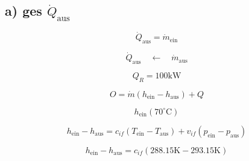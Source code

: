 \subsection*{a) ges $\dot{Q}_{\text{aus}}$}

\[
\dot{Q}_{\text{aus}} = \dot{m}_{\text{ein}}
\]

\[
\dot{Q}_{\text{aus}} \quad \longleftarrow \quad \dot{m}_{\text{aus}}
\]

\[
Q_R = 100 \text{kW}
\]

\[
O = \dot{m} (h_{\text{ein}} - h_{\text{aus}}) + Q
\]

\[
h_{\text{ein}} (70^\circ \text{C})
\]

\[
h_{\text{ein}} - h_{\text{aus}} = c_{if} (T_{\text{ein}} - T_{\text{aus}}) + v_{if} (p_{\text{ein}} - p_{\text{aus}})
\]

\[
h_{\text{ein}} - h_{\text{aus}} = c_{if} (288.15 \text{K} - 293.15 \text{K})
\]